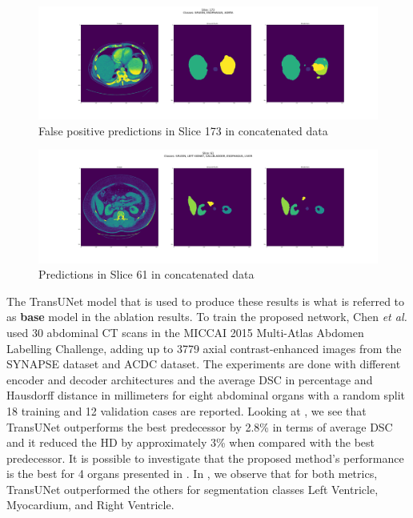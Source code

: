 \documentclass{IEEEtran}
\begin{document}
\begin{figure}[h]
\centering
\includegraphics[width=\textwidth]{img/slice_173.png}
\caption{False positive predictions in Slice 173 in concatenated data}\label{fig:slice1}
\end{figure}
\begin{figure}[h]
\centering
\includegraphics[width=\textwidth]{img/slice_61.png}
\caption{Predictions in Slice 61 in concatenated data}\label{fig:slice2}
\end{figure}

The TransUNet model that is used to produce these results is what is referred to as \textbf{base} model in the ablation results. To train the proposed network, Chen \textit{et al.} used 30 abdominal CT scans in the MICCAI 2015 Multi-Atlas Abdomen Labelling Challenge, adding up to 3779 axial contrast-enhanced images from the SYNAPSE dataset and ACDC dataset. The experiments are done with different encoder and decoder architectures and the average DSC in percentage and Hausdorff distance in millimeters for eight abdominal organs with a random split 18 training and 12 validation cases are reported. Looking at , we see that TransUNet outperforms the best predecessor by 2.8\% in terms of average DSC and it reduced the HD by approximately 3\% when compared with the best predecessor. It is possible to investigate that the proposed method's performance is the best for 4 organs presented in . In , we observe that for both metrics, TransUNet outperformed the others for segmentation classes Left Ventricle, Myocardium, and Right Ventricle.
\end{document}
